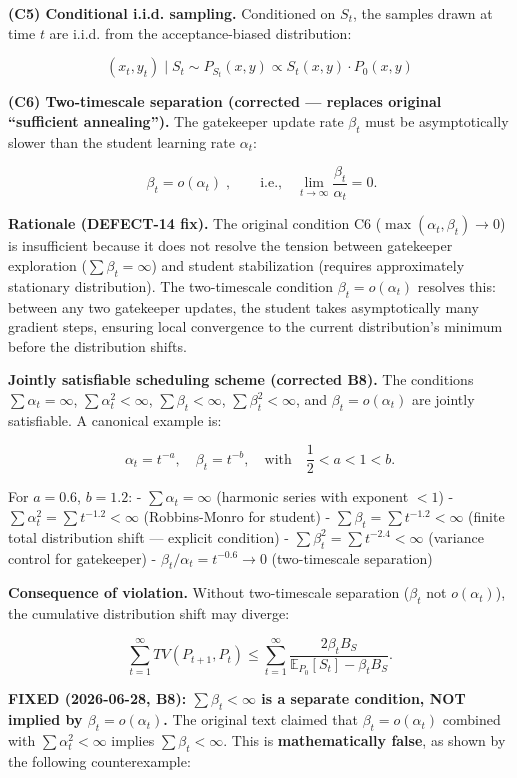 \documentclass[
  12pt,
]{article}
\begin{document}
\textbf{(C5) Conditional i.i.d. sampling.} Conditioned on \(S_t\), the
samples drawn at time \(t\) are i.i.d. from the acceptance-biased
distribution:

\[
(x_t, y_t) \mid S_t \sim P_{S_t}(x,y) \propto S_t(x,y) \cdot P_0(x,y)
\]

\textbf{(C6) Two-timescale separation (corrected --- replaces original
``sufficient annealing'').} The gatekeeper update rate \(\beta_t\) must
be asymptotically slower than the student learning rate \(\alpha_t\):

\[
\boxed{\;\beta_t = o(\alpha_t)\;}, \qquad \text{i.e.,} \quad \lim_{t\to\infty} \frac{\beta_t}{\alpha_t} = 0.
\]

\textbf{Rationale (DEFECT-14 fix).} The original condition C6
(\(\max(\alpha_t, \beta_t) \to 0\)) is insufficient because it does not
resolve the tension between gatekeeper exploration
(\(\sum \beta_t = \infty\)) and student stabilization (requires
approximately stationary distribution). The two-timescale condition
\(\beta_t = o(\alpha_t)\) resolves this: between any two gatekeeper
updates, the student takes asymptotically many gradient steps, ensuring
local convergence to the current distribution's minimum before the
distribution shifts.

\textbf{Jointly satisfiable scheduling scheme (corrected B8).} The
conditions \(\sum \alpha_t = \infty\), \(\sum \alpha_t^2 < \infty\),
\(\sum \beta_t < \infty\), \(\sum \beta_t^2 < \infty\), and
\(\beta_t = o(\alpha_t)\) are jointly satisfiable. A canonical example
is:

\[\alpha_t = t^{-a}, \quad \beta_t = t^{-b}, \quad \text{with} \quad \frac{1}{2} < a < 1 < b.\]

For \(a = 0.6\), \(b = 1.2\): - \(\sum \alpha_t = \infty\) (harmonic
series with exponent \(< 1\)) -
\(\sum \alpha_t^2 = \sum t^{-1.2} < \infty\) (Robbins-Monro for student)
- \(\sum \beta_t = \sum t^{-1.2} < \infty\) (finite total distribution
shift --- explicit condition) -
\(\sum \beta_t^2 = \sum t^{-2.4} < \infty\) (variance control for
gatekeeper) - \(\beta_t/\alpha_t = t^{-0.6} \to 0\) (two-timescale
separation)

\textbf{Consequence of violation.} Without two-timescale separation
(\(\beta_t\) not \(o(\alpha_t)\)), the cumulative distribution shift may
diverge:

\[\sum_{t=1}^\infty TV(P_{t+1}, P_t) \leq \sum_{t=1}^\infty \frac{2\beta_t B_S}{\mathbb{E}_{P_0}[S_t] - \beta_t B_S}.\]

\textbf{FIXED (2026-06-28, B8): \(\sum \beta_t < \infty\) is a separate
condition, NOT implied by \(\beta_t = o(\alpha_t)\).} The original text
claimed that \(\beta_t = o(\alpha_t)\) combined with
\(\sum \alpha_t^2 < \infty\) implies \(\sum \beta_t < \infty\). This is
\textbf{mathematically false}, as shown by the following counterexample:
\end{document}
